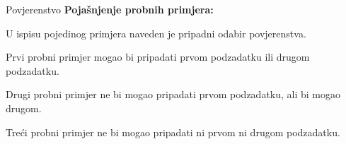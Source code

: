 \begin{statement}[
  problempoints=100,
  timelimit=1 sekunda,
  memorylimit=512 MiB,
]{Povjerenstvo}
\textbf{Pojašnjenje probnih primjera:}

U ispisu pojedinog primjera naveden je pripadni odabir povjerenstva.

Prvi probni primjer mogao bi pripadati prvom podzadatku ili drugom podzadatku.

Drugi probni primjer ne bi mogao pripadati prvom podzadatku, ali bi mogao drugom.

Treći probni primjer ne bi mogao pripadati ni prvom ni drugom podzadatku.

\end{statement}

